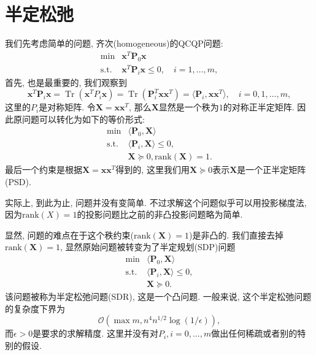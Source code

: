 \documentclass{article}
\DeclareMathOperator{\Tr}{Tr}
\begin{document}
\section{半定松弛}
我们先考虑简单的问题, 齐次(homogeneous)的QCQP问题: 
\begin{equation}
\begin{array}{cl}
{\min} & {\bm{x}^T \bm{P}_0 \bm{x}} \\
{\text{s.t.}} & {\bm{x}^T \bm{P}_i \bm{x} \leq 0, \quad i = 1,\dots,m},
\end{array}
\end{equation}
首先, 也是最重要的, 我们观察到
\begin{equation}
\bm{x}^T \bm{P}_i \bm{x} = \Tr(\bm{x}^T P_i \bm{x}) = \Tr(\bm{P}_i^T \bm{x} \bm{x}^T) = \langle \bm{P}_i, \bm{x} \bm{x}^T \rangle,\quad i=0,1,\dots,m,
\end{equation}
这里的$P_i$是对称矩阵.
令$\bm{X} = \bm{x}\bm{x}^T$, 那么$\bm{X}$显然是一个秩为$1$的对称正半定矩阵.
因此原问题可以转化为如下的等价形式:
\begin{equation}
\begin{array}{cl}
{\min} & {\langle \bm{P}_0, \bm{X} \rangle} \\
{\text{s.t.}} & {\langle \bm{P}_i, \bm{X} \rangle \leq 0}, \\
{} & {\bm{X} \succeq 0, \text{rank}(\bm{X}) = 1}.
\end{array}
\end{equation}
最后一个约束是根据$\bm{X} = \bm{x}\bm{x}^T$得到的, 这里我们用$\bm{X} \succeq 0$表示$\bm{X}$是一个正半定矩阵(PSD).

实际上, 到此为止, 问题并没有变简单. 不过求解这个问题似乎可以用投影梯度法, 因为$\text{rank}(X)=1$的投影问题比之前的非凸投影问题略为简单.

显然, 问题的难点在于这个秩约束($\text{rank}(\bm{X}) = 1$)是非凸的.
我们直接去掉$\text{rank}(\bm{X}) = 1$, 显然原始问题被转变为了半定规划(SDP)问题
\begin{equation} \label{equ:SDR}
\begin{array}{cl}
{\min} & {\langle \bm{P}_0,\bm{X} \rangle} \\
{\text{s.t.}} & {\langle \bm{P}_i,\bm{X} \rangle \leq 0}, \\
{} & {\bm{X} \succeq 0}.
\end{array}
\end{equation}
该问题被称为半定松弛问题(SDR), 这是一个凸问题.
一般来说, 这个半定松弛问题的复杂度下界为
\begin{equation}
\mathcal{O}(\max{m,n}^4 n^{1/2}\log(1/\epsilon)),
\end{equation}
而$\epsilon>0$是要求的求解精度. 这里并没有对$P_i, i=0,\dots,m$做出任何稀疏或者别的特别的假设.
\end{document}
